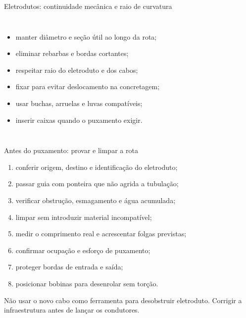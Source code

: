 \begin{frame}{Eletrodutos: continuidade mecânica e raio de curvatura}
\small
\begin{columns}[T,onlytextwidth]
\begin{itemize}
\item manter diâmetro e seção útil ao longo da rota;
\item eliminar rebarbas e bordas cortantes;
\item respeitar raio do eletroduto e dos cabos;
\item fixar para evitar deslocamento na concretagem;
\item usar buchas, arruelas e luvas compatíveis;
\item inserir caixas quando o puxamento exigir.
\end{itemize}
\end{columns}
\end{frame}

\begin{frame}{Antes do puxamento: provar e limpar a rota}
\small
\begin{enumerate}
\item conferir origem, destino e identificação do eletroduto;
\item passar guia com ponteira que não agrida a tubulação;
\item verificar obstrução, esmagamento e água acumulada;
\item limpar sem introduzir material incompatível;
\item medir o comprimento real e acrescentar folgas previstas;
\item confirmar ocupação e esforço de puxamento;
\item proteger bordas de entrada e saída;
\item posicionar bobinas para desenrolar sem torção.
\end{enumerate}
\begin{caixaAt}
Não usar o novo cabo como ferramenta para desobstruir eletroduto. Corrigir a infraestrutura antes de lançar os condutores.
\end{caixaAt}
\end{frame}

